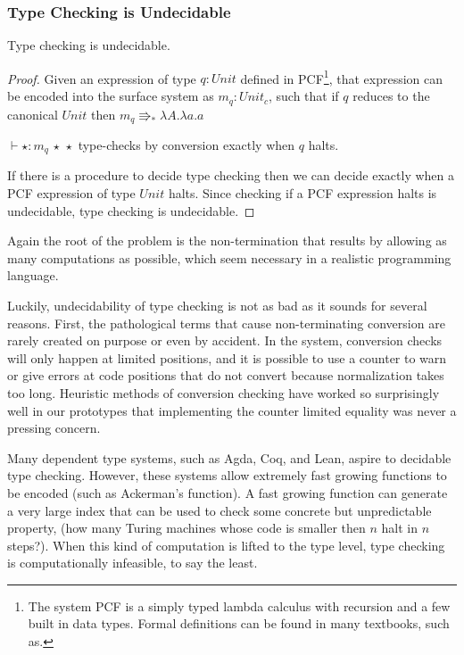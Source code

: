 \subsubsection{Type Checking is Undecidable}

\begin{thm} Type checking is undecidable.
\end{thm}
\begin{proof}
Given an expression of type $q:Unit$ defined in PCF\footnote{
  The system PCF is a simply typed lambda calculus with recursion and a few built in data types.
  Formal definitions can be found in many textbooks, such as\cite{streicher2006domain}.
}, that expression can be encoded into the surface system as $m_q:Unit_{c}$, such that if $q$ reduces to the canonical $Unit$ then $m_q\Rrightarrow_{\ast}\lambda A.\lambda a.a$

$\vdash\star:m_q\,\star\,\star$ type-checks by conversion exactly when $q$ halts.

If there is a procedure to decide type checking then we can decide exactly when a PCF expression of type $Unit$ halts.
Since checking if a PCF expression halts is undecidable, type checking is undecidable.

\end{proof}
 
Again the root of the problem is the non-termination that results by allowing as many computations as possible, which seem necessary in a realistic programming language.
 
Luckily, undecidability of type checking is not as bad as it sounds for several reasons.
First, the pathological terms that cause non-terminating conversion are rarely created on purpose or even by accident.
In the \bidir{} system, conversion checks will only happen at limited positions, and it is possible to use a counter to warn or give errors at code positions that do not convert because normalization takes too long.
Heuristic methods of conversion checking have worked so surprisingly well in our prototypes that implementing the counter limited equality was never a pressing concern.
 
Many dependent type systems, such as Agda, Coq, and Lean, aspire to decidable type checking.
However, these systems allow extremely fast growing functions to be encoded (such as Ackerman's function).
A fast growing function can generate a very large index that can be used to check some concrete but unpredictable property, (how many Turing machines whose code is smaller then $n$ halt in $n$ steps?).
When this kind of computation is lifted to the type level, type checking is computationally infeasible, to say the least.
 
